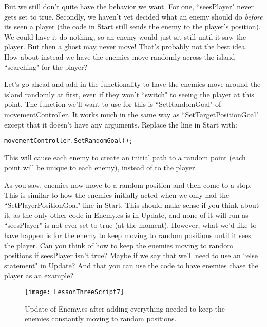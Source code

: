 \documentclass{article}
\begin{document}
But we still don't quite have the behavior we want. For one, ``seesPlayer" never gets set to true. Secondly, we haven't yet decided what an enemy should do \textit{before} its seen a player (the code in Start still sends the enemy to the player's position). We could have it do nothing, so an enemy would just sit still until it saw the player. But then a ghost may never move! That's probably not the best idea. How about instead we have the enemies move randomly across the island ``searching" for the player?

Let's go ahead and add in the functionality to have the enemies move around the island randomly at first, even if they won't ``switch" to seeing the player at this point. The function we'll want to use for this is ``SetRandomGoal" of movementController. It works much in the same way as ``SetTargetPositionGoal" except that it doesn't have any arguments. Replace the line in Start with:

\lstset{style=sharpc}
\begin{lstlisting}
movementController.SetRandomGoal();
\end{lstlisting} 

This will cause each enemy to create an initial path to a random point (each point will be unique to each enemy), instead of to the player.

\noindent{}

As you saw, enemies now move to a random position and then come to a stop. This is similar to how the enemies initially acted when we only had the ``SetPlayerPositionGoal" line in Start. This should make sense if you think about it, as the only other code in Enemy.cs is in Update, and none of it will run as ``seesPlayer" is not ever set to true (at the moment). However, what we'd like to have happen is for the enemy to keep moving to random positions until it sees the player. Can you think of how to keep the enemies moving to random positions if seesPlayer isn't true? Maybe if we say that we'll need to use an ``else statement" in Update? And that you can use the code to have enemies chase the player as an example?

\begin{figure}
  \texttt{[image: LessonThreeScript7]}
  \caption{Update of Enemy.cs after adding everything needed to keep the enemies constantly moving to random positions.}
  \label{fig:LessonThreeScript7}
\end{figure}
\end{document}
